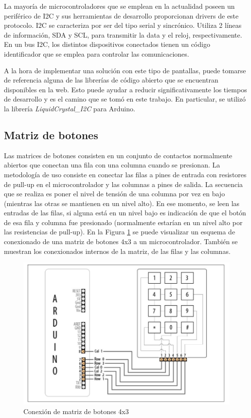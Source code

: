 La mayoría de microcontroladores que se emplean en la actualidad poseen un periférico de I2C y sus herramientas de desarrollo proporcionan drivers de este protocolo. I2C se caracteriza por ser del tipo serial y sincrónico. Utiliza 2 líneas de información, SDA y SCL, para transmitir la data y el reloj, respectivamente. En un bus I2C, los distintos dispositivos conectados tienen un código identificador que se emplea para controlar las comunicaciones.

A la hora de implementar una solución con este tipo de pantallas, puede tomarse de referencia alguna de las librerías de código abierto que se encuentran disponibles en la web. Esto puede ayudar a reducir significativamente los tiempos de desarrollo y es el camino que se tomó en este trabajo. En particular, se utilizó la librería \textit{LiquidCrystal\_I2C} para Arduino\citep{web_repo_display_i2c}.

\subsection{Matriz de botones}
\label{teclado}
Las matrices de botones consisten en un conjunto de contactos normalmente abiertos que conectan una fila con una columna cuando se presionan. La metodología de uso consiste en conectar las filas a pines de entrada con resistores de pull-up en el microcontrolador y las columnas a pines de salida. La secuencia que se realiza es poner el nivel de tensión de una columna por vez en bajo (mientras las otras se mantienen en un nivel alto). En ese momento, se leen las entradas de las filas, si alguna está en un nivel bajo es indicación de que el botón de esa fila y columna fue presionado (normalmente estarían en un nivel alto por las resistencias de pull-up)\citep{Arduino_Cookbook}. En la Figura \ref{fig:but_matrix} se puede visualizar un esquema de conexionado de una matriz de botones 4x3 a un microcontrolador. También se muestran los conexionados internos de la matriz, de las filas y las columnas.

\begin{figure}[htbp]
	\centering
	\includegraphics[scale=.6]{./Figures/But_Matrix.JPG}
	\caption{Conexión de matriz de botones 4x3\citep{Arduino_Cookbook}}
	\label{fig:but_matrix}
\end{figure}

